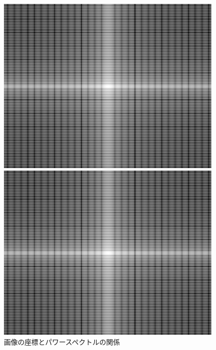 \begin{figure}[H]
\begin{minipage}[b]{.2\textwidth}
    \end{minipage}
    \begin{minipage}[b]{.25\textwidth}
        \centering
        \includegraphics[keepaspectratio,width=\textwidth]{../../Figures/08_33_rec1-fft.pdf}
    \end{minipage}
    \begin{minipage}[b]{.25\textwidth}
        \centering
        \includegraphics[keepaspectratio,width=\textwidth]{../../Figures/08_34_rec2-fft.pdf}
    \end{minipage}
    \caption{画像の座標とパワースペクトルの関係}
\end{figure}
